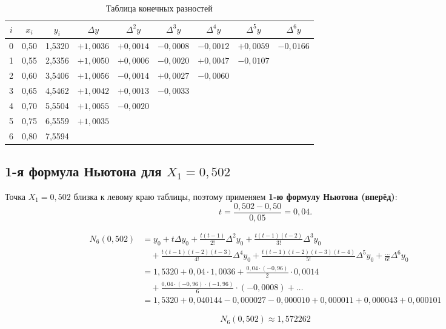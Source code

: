 \documentclass[a4paper,12pt]{article}
\begin{document}
\begin{table}[H]
\centering
\caption{Таблица конечных разностей}
\small
\begin{tabular}{|c|c|c|c|c|c|c|c|c|}
\hline
$i$ & $x_i$ & $y_i$ & $\Delta y$ & $\Delta^2 y$ & $\Delta^3 y$ & $\Delta^4 y$ & $\Delta^5 y$ & $\Delta^6 y$ \\
\hline
0 & 0{,}50 & 1{,}5320 & $+1{,}0036$ & $+0{,}0014$ & $-0{,}0008$ & $-0{,}0012$ & $+0{,}0059$ & $-0{,}0166$ \\
1 & 0{,}55 & 2{,}5356 & $+1{,}0050$ & $+0{,}0006$ & $-0{,}0020$ & $+0{,}0047$ & $-0{,}0107$ & \\
2 & 0{,}60 & 3{,}5406 & $+1{,}0056$ & $-0{,}0014$ & $+0{,}0027$ & $-0{,}0060$ & & \\
3 & 0{,}65 & 4{,}5462 & $+1{,}0042$ & $+0{,}0013$ & $-0{,}0033$ & & & \\
4 & 0{,}70 & 5{,}5504 & $+1{,}0055$ & $-0{,}0020$ & & & & \\
5 & 0{,}75 & 6{,}5559 & $+1{,}0035$ & & & & & \\
6 & 0{,}80 & 7{,}5594 & & & & & & \\
\hline
\end{tabular}
\end{table}

\subsection{1-я формула Ньютона для \texorpdfstring{$X_1=0{,}502$}{X1=0.502}}

Точка $X_1=0{,}502$ близка к левому краю таблицы, поэтому применяем
\textbf{1-ю формулу Ньютона (вперёд)}:
\[
  t=\frac{0{,}502-0{,}50}{0{,}05}=0{,}04.
\]

\begin{align*}
N_6(0{,}502)
&=y_0 + t\Delta y_0 + \tfrac{t(t-1)}{2!}\Delta^2 y_0
  + \tfrac{t(t-1)(t-2)}{3!}\Delta^3 y_0\\
&\quad + \tfrac{t(t-1)(t-2)(t-3)}{4!}\Delta^4 y_0
  + \tfrac{t(t-1)(t-2)(t-3)(t-4)}{5!}\Delta^5 y_0
  + \tfrac{\ldots}{6!}\Delta^6 y_0\\[4pt]
&= 1{,}5320
 + 0{,}04\cdot1{,}0036
 + \tfrac{0{,}04\cdot(-0{,}96)}{2}\cdot0{,}0014\\
&\quad + \tfrac{0{,}04\cdot(-0{,}96)\cdot(-1{,}96)}{6}\cdot(-0{,}0008)
 + \ldots\\
&= 1{,}5320 + 0{,}040144 - 0{,}000027 - 0{,}000010
   + 0{,}000011 + 0{,}000043 + 0{,}000101
\end{align*}

\[
  \boxed{N_6(0{,}502) \approx 1{,}572262}
\]
\end{document}
